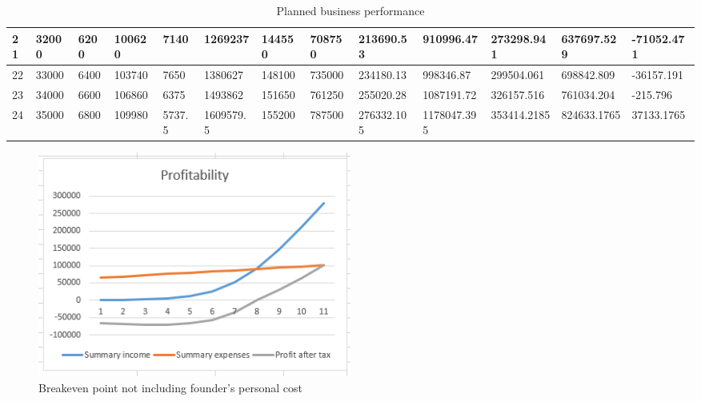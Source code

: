 \begin{table}[]
{\begin{tabular}{|l|l|l|l|l|l|l|l|l|l|l|l|l|}
        21    & 32000     & 6200          & 100620                                                & 7140                                                           & 1269237                                                  & 144550                                                     & 708750                                                          & 213690.53  & 910996.47   & 273298.941    & 637697.529       & -71052.471      \\ \hline
        22    & 33000     & 6400          & 103740                                                & 7650                                                           & 1380627                                                  & 148100                                                     & 735000                                                          & 234180.13  & 998346.87   & 299504.061    & 698842.809       & -36157.191      \\ \hline
        23    & 34000     & 6600          & 106860                                                & 6375                                                           & 1493862                                                  & 151650                                                     & 761250                                                          & 255020.28  & 1087191.72  & 326157.516    & 761034.204       & -215.796        \\ \hline
        24    & 35000     & 6800          & 109980                                                & 5737.5                                                         & 1609579.5                                                & 155200                                                     & 787500                                                          & 276332.105 & 1178047.395 & 353414.2185   & 824633.1765      & 37133.1765      \\ \hline
        \end{tabular}}
    \caption{Planned business performance}
    \label{fig:budget}
\end{table}
\renewcommand{\arraystretch}{1} %

\begin{figure}[H]
    \centering
    \includegraphics[width=0.5\textwidth]{figures/breakeven_no_salary.png}
    \caption{Breakeven point not including founder's personal cost}
    \label{fig:breakeven_no_salary}
\end{figure}

